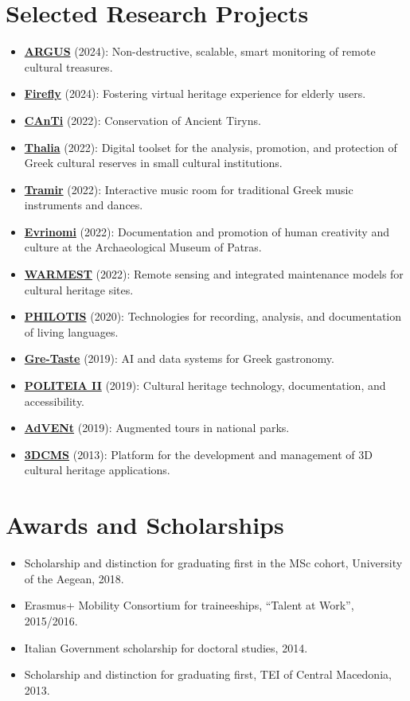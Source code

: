 \documentclass[11pt,a4paper]{article}
\newcommand{\cvsection}[1]{\section*{#1}}
\begin{document}
\cvsection{Selected Research Projects}
\begin{itemize}
  \item \textbf{\href{https://www.argus-project.eu}{ARGUS}} (2024): Non-destructive, scalable, smart monitoring of remote cultural treasures.
  \item \textbf{\href{https://firefly.athenarc.gr}{Firefly}} (2024): Fostering virtual heritage experience for elderly users.
  \item \textbf{\href{http://canti.athenarc.gr}{CAnTi}} (2022): Conservation of Ancient Tiryns.
  \item \textbf{\href{http://thalia.athenarc.gr}{Thalia}} (2022): Digital toolset for the analysis, promotion, and protection of Greek cultural reserves in small cultural institutions.
  \item \textbf{\href{https://tramir.bookscanner.gr}{Tramir}} (2022): Interactive music room for traditional Greek music instruments and dances.
  \item \textbf{\href{http://evrinomi.athenarc.gr}{Evrinomi}} (2022): Documentation and promotion of human creativity and culture at the Archaeological Museum of Patras.
  \item \textbf{\href{http://www.warmestproject.eu/}{WARMEST}} (2022): Remote sensing and integrated maintenance models for cultural heritage sites.
  \item \textbf{\href{http://philotis.athenarc.gr}{PHILOTIS}} (2020): Technologies for recording, analysis, and documentation of living languages.
  \item \textbf{\href{http://gre-taste.ceti.gr}{Gre-Taste}} (2019): AI and data systems for Greek gastronomy.
  \item \textbf{\href{https://politeia-ii.ims.forth.gr/vtms}{POLITEIA II}} (2019): Cultural heritage technology, documentation, and accessibility.
  \item \textbf{\href{http://advent.ceti.gr}{AdVENt}} (2019): Augmented tours in national parks.
  \item \textbf{\href{http://3dcms.ceti.gr}{3DCMS}} (2013): Platform for the development and management of 3D cultural heritage applications.
\end{itemize}

\cvsection{Awards and Scholarships}
\begin{itemize}
  \item Scholarship and distinction for graduating first in the MSc cohort, University of the Aegean, 2018.
  \item Erasmus+ Mobility Consortium for traineeships, ``Talent at Work'', 2015/2016.
  \item Italian Government scholarship for doctoral studies, 2014.
  \item Scholarship and distinction for graduating first, TEI of Central Macedonia, 2013.
\end{itemize}
\end{document}
